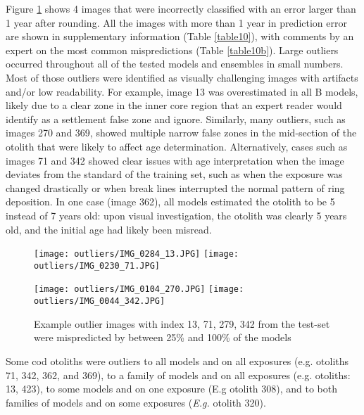 \documentclass[10pt,letterpaper]{article}
\begin{document}
Figure \ref{marker8} shows 4 images that were incorrectly classified with an error larger than 1 year after rounding. All the images with more than 1 year in prediction error are shown in supplementary information (Table \ref{table10}), with comments by an expert on the most
common mispredictions (Table \ref{table10b}). Large outliers occurred throughout all of the tested models and ensembles in small numbers. Most of those outliers were identified as visually challenging images with artifacts and/or low readability. For example, image 13 was overestimated in all B models, likely due to a clear zone in the inner core region that an expert reader would identify as a settlement false zone and ignore. Similarly, many outliers, such as images 270 and 369, showed multiple narrow false zones in the mid-section of the otolith that were likely to affect age determination. Alternatively, cases such as images 71 and 342 showed clear issues with age interpretation when the image deviates from the standard of the training set, such as when the exposure was changed drastically or when break lines interrupted the normal pattern of ring deposition. In one case (image 362), all models estimated the otolith to be 5 instead of 7 years old: upon visual investigation, the otolith was clearly 5 years old, and the initial age had likely been misread.

\begin{figure}[hbt!]
  \centering
  \texttt{[image: outliers/IMG\_0284\_13.JPG]}
  \texttt{[image: outliers/IMG\_0230\_71.JPG]}
  
  \texttt{[image: outliers/IMG\_0104\_270.JPG]} 
  \texttt{[image: outliers/IMG\_0044\_342.JPG]}
  
  
    \caption{Example outlier images with index 13, 71, 279, 342
  from the test-set
  were mispredicted by between 25\% and 100\% of the models}
  \label{marker8}
\end{figure}

Some cod otoliths were outliers to all models and on all exposures (e.g. otoliths 71, 342, 362, and 369),
to a family of models and on all exposures (e.g. otoliths: 13, 423), 
to some models and on one exposure (E.g otolith 308), 
and to both families of models and on some exposures (\textit{E.g.} otolith 320).
\end{document}
